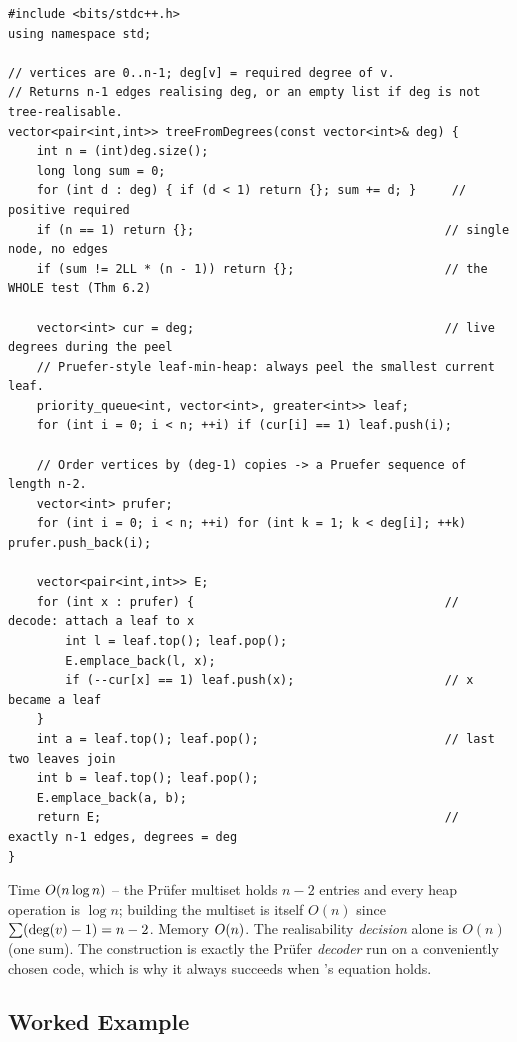 \begin{lstlisting}[caption={Construct a tree realising a degree sequence, or report it impossible}, label={lst:c25-degbld}]
#include <bits/stdc++.h>
using namespace std;

// vertices are 0..n-1; deg[v] = required degree of v.
// Returns n-1 edges realising deg, or an empty list if deg is not tree-realisable.
vector<pair<int,int>> treeFromDegrees(const vector<int>& deg) {
    int n = (int)deg.size();
    long long sum = 0;
    for (int d : deg) { if (d < 1) return {}; sum += d; }     // positive required
    if (n == 1) return {};                                   // single node, no edges
    if (sum != 2LL * (n - 1)) return {};                     // the WHOLE test (Thm 6.2)

    vector<int> cur = deg;                                   // live degrees during the peel
    // Pruefer-style leaf-min-heap: always peel the smallest current leaf.
    priority_queue<int, vector<int>, greater<int>> leaf;
    for (int i = 0; i < n; ++i) if (cur[i] == 1) leaf.push(i);

    // Order vertices by (deg-1) copies -> a Pruefer sequence of length n-2.
    vector<int> prufer;
    for (int i = 0; i < n; ++i) for (int k = 1; k < deg[i]; ++k) prufer.push_back(i);

    vector<pair<int,int>> E;
    for (int x : prufer) {                                   // decode: attach a leaf to x
        int l = leaf.top(); leaf.pop();
        E.emplace_back(l, x);
        if (--cur[x] == 1) leaf.push(x);                     // x became a leaf
    }
    int a = leaf.top(); leaf.pop();                          // last two leaves join
    int b = leaf.top(); leaf.pop();
    E.emplace_back(a, b);
    return E;                                                // exactly n-1 edges, degrees = deg
}
\end{lstlisting}
\begin{complexitybox}
Time $O(n\log n)$ -- the Pr\"ufer multiset holds $n-2$ entries and every heap operation is
$\log n$; building the multiset is itself $O(n)$ since $\sum(\operatorname{deg}(v)-1)=n-2$. Memory $O(n)$.
The realisability \emph{decision} alone is $O(n)$ (one sum). The construction is exactly the
Pr\"ufer \emph{decoder} run on a conveniently chosen code, which is why it always succeeds when
's equation holds.
\end{complexitybox}

\subsection{Worked Example}

